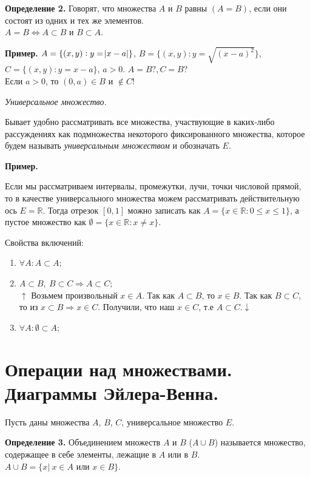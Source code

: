 \documentclass{article}
\begin{document}
    \textbf{Определение 2.} Говорят, что множества $A$ и $B$ равны $(A = B)$, если они состоят из одних и тех же элементов.\\
    $A = B \Leftrightarrow A \subset B$ и $B \subset A$.

    \textbf{Пример.}
	$A = \{(x, y): y = \abs{x-a}\}$, $B = \{(x, y): y = \sqrt{(x - a)^2}\}$, $C = \{(x, y): y = x - a\}$, $a > 0$. $A = B ?, C = B ?$\\ 
    Если $a > 0$, то $(0, a) \in B$ и $\not\in C!$

    \textit{Универсальное множество.}
    
    Бывает удобно рассматривать все множества, участвующие в каких-либо рассуждениях как подмножества некоторого фиксированного множества, которое будем называть \textit{универсальным множеством} и обозначать $E$.
    
    \textbf{Пример.}

    Если мы рассматриваем интервалы, промежутки, лучи, точки числовой прямой, то в качестве универсального множества можем рассматривать действительную ось $E = \mathbb{R}$. Тогда отрезок $[0, 1]$ можно записать как $A = \{ x \in \mathbb{R}: 0 \leq x \leq 1 \}$, а пустое множество как $\emptyset = \{x \in \mathbb{R}: x \neq x\}$.

    Свойства включений:

    \begin{enumerate}
        \item $\forall A: A \subset A$;
        \item $A \subset B,\ B \subset C \Rightarrow A \subset C$;\\
        $\uparrow$ Возьмем произвольный $x \in A$. Так как $A \subset B$, то $x \in B$. Так как $B \subset C$, то из $x \subset B \Rightarrow x \in C$. Получили, что наш $x \in C$, т.е $A \subset C. \downarrow$
        \item $\forall A: \emptyset \subset A$; 
    \end{enumerate} 

    \section{Операции над множествами. Диаграммы Эйлера-Венна.}

    Пусть даны множества $A$, $B$, $C$, универсальное множество $E$. 

    \textbf{Определение 3.} Объединением множеств $A$ и $B$ ($A \cup B$) называется множество, содержащее в себе элементы, лежащие в $A$ или в $B$. $A \cup B = \{x|\ x \in A \textrm{ или } x \in B\}$. 
\end{document}
